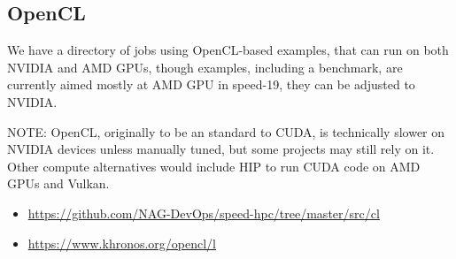 \subsection{OpenCL}
\label{sect:cl}

We have a directory of jobs using OpenCL-based examples, that can
run on both NVIDIA and AMD GPUs, though examples, including a
benchmark, are currently aimed mostly at AMD GPU in speed-19, they can
be adjusted to NVIDIA.

NOTE: OpenCL, originally to be an standard to CUDA,
is technically slower on NVIDIA devices unless manually tuned,
but some projects may still rely on it. Other compute alternatives
would include HIP to run CUDA code on AMD GPUs and Vulkan.

\begin{itemize}
  \item \url{https://github.com/NAG-DevOps/speed-hpc/tree/master/src/cl}
  \item \url{https://www.khronos.org/opencl/l}
\end{itemize}

